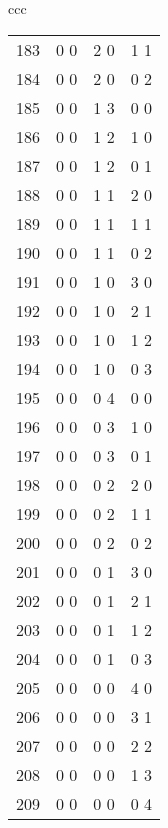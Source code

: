 {\begin{center}
\begin{tabular}{ccc}
\begin{tabular}{rccc}
183\hspace*{.125in}&0 0&2 0&1 1\\
184\hspace*{.125in}&0 0&2 0&0 2\\
185\hspace*{.125in}&0 0&1 3&0 0\\
186\hspace*{.125in}&0 0&1 2&1 0\\
187\hspace*{.125in}&0 0&1 2&0 1\\
188\hspace*{.125in}&0 0&1 1&2 0\\
189\hspace*{.125in}&0 0&1 1&1 1\\
190\hspace*{.125in}&0 0&1 1&0 2\\
191\hspace*{.125in}&0 0&1 0&3 0\\
192\hspace*{.125in}&0 0&1 0&2 1\\
193\hspace*{.125in}&0 0&1 0&1 2\\
194\hspace*{.125in}&0 0&1 0&0 3\\
195\hspace*{.125in}&0 0&0 4&0 0\\
196\hspace*{.125in}&0 0&0 3&1 0\\
197\hspace*{.125in}&0 0&0 3&0 1\\
198\hspace*{.125in}&0 0&0 2&2 0\\
199\hspace*{.125in}&0 0&0 2&1 1\\
200\hspace*{.125in}&0 0&0 2&0 2\\
201\hspace*{.125in}&0 0&0 1&3 0\\
202\hspace*{.125in}&0 0&0 1&2 1\\
203\hspace*{.125in}&0 0&0 1&1 2\\
204\hspace*{.125in}&0 0&0 1&0 3\\
205\hspace*{.125in}&0 0&0 0&4 0\\
206\hspace*{.125in}&0 0&0 0&3 1\\
207\hspace*{.125in}&0 0&0 0&2 2\\
208\hspace*{.125in}&0 0&0 0&1 3\\
209\hspace*{.125in}&0 0&0 0&0 4\\
\end{tabular}
\end{tabular}
\end{center}

}
